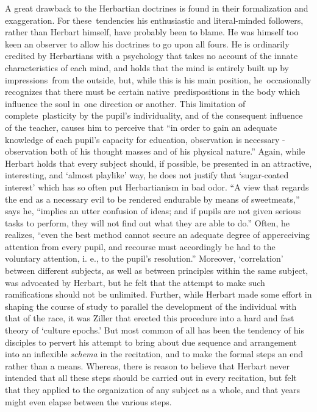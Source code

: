 \documentclass[]{book}
\begin{document}
A great drawback to the Herbartian doctrines is found in their formalization and exaggeration. For these~tendencies his enthusiastic and literal-minded followers, rather than Herbart himself, have probably been to blame. He was himself too keen an observer to allow his doctrines to go upon all fours. He is ordinarily credited by Herbartians with a psychology that takes no account of the innate characteristics of each mind, and holds that the mind is entirely built up by impressions~from the outside, but, while this is his main position, he~occasionally recognizes that there must be certain native~predispositions in the body which influence the soul in~one direction or another. This limitation of complete~plasticity by the pupil's individuality, and of the consequent influence of the teacher, causes him to perceive that ``in order to gain an adequate knowledge of each pupil's capacity for education, observation is necessary - observation both of his thought masses and of his physical nature.'' Again, while Herbart holds that every subject should, if possible, be presented in an attractive, interesting, and `almost playlike' way, he does not justify that `sugar-coated interest' which has so often put Herbartianism in bad odor. ``A view that regards the end as a necessary evil to be rendered endurable by means of sweetmeats,'' says he, ``implies an utter confusion of ideas; and if pupils are not given serious tasks to perform, they will not find out what they are able to do.'' Often, he realizes, ``even the best method cannot secure an adequate degree of apperceiving attention from every pupil, and recourse must accordingly be had to the voluntary attention, i. e., to the pupil's resolution.'' Moreover, `correlation' between different subjects, as well as between principles within the same subject, was advocated by Herbart, but he felt that the attempt to make such ramifications should not be unlimited. Further, while Herbart made some effort in shaping the course of study to parallel the development of the individual with that of the race, it was Ziller that erected this procedure into a hard and fast theory of `culture epochs.' But most common of all has been the tendency of his disciples to pervert his attempt to bring about due sequence and arrangement into an inflexible \emph{schema} in the recitation, and to make the formal steps an end rather than a means. Whereas, there is reason to believe that Herbart never intended that all these steps should be carried out in every recitation, but felt that they applied to the organization of any subject as a whole, and that years might even elapse between the various steps.
\end{document}
